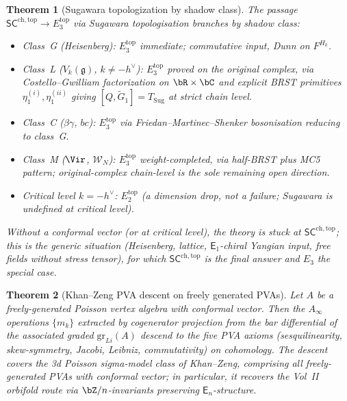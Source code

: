 \documentclass[11pt,reqno]{amsart}
\newtheorem{theorem}{Theorem}[section]
\theoremstyle{definition}
\theoremstyle{remark}
\newcommand{\cW}{\mathcal{W}}
\newcommand{\fg}{\mathfrak{g}}
\newcommand{\Ainf}{A_{\infty}}
\newcommand{\Eone}{\mathsf{E}_{1}}
\newcommand{\En}{\mathsf{E}_{n}}
\newcommand{\SCchtop}{\mathsf{SC}^{\mathrm{ch,top}}}
\numberwithin{equation}{section}
\begin{document}
\begin{theorem}[Sugawara topologization by shadow class]
\label{thm:topologization-scope}
The passage $\SCchtop \to E_3^{\mathrm{top}}$ via Sugawara
topologisation branches by shadow class:
\begin{itemize}
\item Class~G (Heisenberg): $E_3^{\mathrm{top}}$ immediate;
  commutative input, Dunn on $F^{H_k}$.
\item Class~L ($V_k(\fg)$, $k \ne -h^\vee$):
  $E_3^{\mathrm{top}}$ \emph{proved on the original complex}, via
  Costello--Gwilliam factorization on $\bR \times \bC$ and explicit
  BRST primitives $\eta_1^{(i)}, \eta_1^{(ii)}$ giving
  $[Q, \widetilde G_1] = T_{\mathrm{Sug}}$ at strict chain level.
\item Class~C ($\beta\gamma$, $bc$): $E_3^{\mathrm{top}}$ via
  Friedan--Martinec--Shenker bosonisation reducing to class~G.
\item Class~M ($\Vir$, $\cW_N$): $E_3^{\mathrm{top}}$
  \emph{weight-completed}, via half-BRST plus MC5 pattern;
  original-complex chain-level is the sole remaining open
  direction.
\item Critical level $k = -h^\vee$: $E_2^{\mathrm{top}}$
  (a dimension drop, not a failure; Sugawara is undefined at
  critical level).
\end{itemize}
Without a conformal vector (or at critical level), the theory is
stuck at $\SCchtop$; this is the generic situation (Heisenberg,
lattice, $\Eone$-chiral Yangian input, free fields without stress
tensor), for which $\SCchtop$ is the final answer and $E_3$ the
special case.
\end{theorem}

\begin{theorem}[Khan--Zeng PVA descent on freely generated PVAs]
\label{thm:khan-zeng-pva-descent}
Let $A$ be a freely-generated Poisson vertex algebra with
conformal vector. Then the $\Ainf$ operations $\{m_k\}$ extracted
by cogenerator projection from the bar differential of the
associated graded $\mathrm{gr}_{Li}(A)$ descend to the five PVA
axioms (sesquilinearity, skew-symmetry, Jacobi, Leibniz,
commutativity) on cohomology. The descent covers the
3d Poisson sigma-model class of Khan--Zeng, comprising all
freely-generated PVAs with conformal vector; in particular, it
recovers the Vol~II orbifold route via $\bZ/n$-invariants
preserving $\En$-structure.
\end{theorem}
\end{document}
